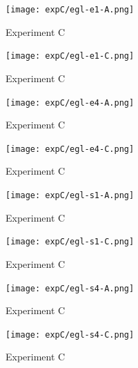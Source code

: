 \documentclass[twoside]{ctuthesis}
\theoremstyle{plain}
\theoremstyle{definition}
\theoremstyle{note}
\begin{document}
\begin{figure}[htbp]
	\centering
	\texttt{[image: expC/egl-e1-A.png]}
	\caption{Experiment C}
	\label{fig:your-figure}
\end{figure}
\begin{figure}[htbp]
	\centering
	\texttt{[image: expC/egl-e1-C.png]}
	\caption{Experiment C}
	\label{fig:your-figure}
\end{figure}
\begin{figure}[htbp]
	\centering
	\texttt{[image: expC/egl-e4-A.png]}
	\caption{Experiment C}
	\label{fig:your-figure}
\end{figure}
\begin{figure}[htbp]
	\centering
	\texttt{[image: expC/egl-e4-C.png]}
	\caption{Experiment C}
	\label{fig:your-figure}
\end{figure}
\begin{figure}[htbp]
	\centering
	\texttt{[image: expC/egl-s1-A.png]}
	\caption{Experiment C}
	\label{fig:your-figure}
\end{figure}
\begin{figure}[htbp]
	\centering
	\texttt{[image: expC/egl-s1-C.png]}
	\caption{Experiment C}
	\label{fig:your-figure}
\end{figure}
\begin{figure}[htbp]
	\centering
	\texttt{[image: expC/egl-s4-A.png]}
	\caption{Experiment C}
	\label{fig:your-figure}
\end{figure}
\begin{figure}[htbp]
	\centering
	\texttt{[image: expC/egl-s4-C.png]}
	\caption{Experiment C}
	\label{fig:your-figure}
\end{figure}







\end{document}
